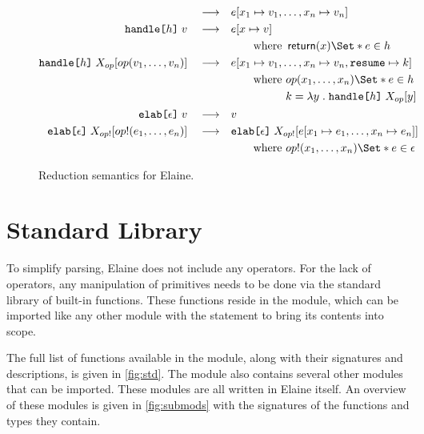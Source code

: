 \begin{figure}[p]
\begin{align*}
    \reduce& e[x_1 \mapsto v_1, \dots, x_n \mapsto v_n]
    \\
    \kw{handle}\tok{[}h\tok{]}\;v \reduce& e[x\mapsto v] \\
    &\qquad\text{where } \return(x) \S{ e } \in h\\
    \kw{handle}\tok{[}h\tok{]}\;X_{op}[op(v_1, \dots, v_n)] \reduce& e[x_1\mapsto v_1, \dots, x_n\mapsto v_n, \kw{resume} \mapsto k] \\
    &\qquad \text{where } \begin{aligned}[t]
        & op(x_1, \dots, x_n) \S{e} \in h\\
        & k = \lam{y}{\kw{handle}\tok{[}h\tok{]}\;
        X_{op}[y]}
    \end{aligned}\\
    \kw{elab}\tok{[}\epsilon\tok{]}\;v \reduce& v\\
    \kw{elab}\tok{[}\epsilon\tok{]}\;X_{op!}[op!(e_1, \dots, e_n)] \reduce& \kw{elab}\tok{[}\epsilon\tok{]}\;X_{op!}[e[x_1 \mapsto e_1, \dots, x_n \mapsto e_n]] \\
    &\qquad \text{where } op!(x_1, \dots, x_n) \S{e} \in \epsilon \\
\end{align*}
\label{fig:reductionsemantics}
\caption{Reduction semantics for Elaine.}
\end{figure}

\section{Standard Library}\label{sec:std}

To simplify parsing, Elaine does not include any operators. For the lack of operators, any manipulation of primitives needs to be done via the standard library of built-in functions. These functions reside in the  module, which can be imported like any other module with the  statement to bring its contents into scope.

The full list of functions available in the  module, along with their signatures and descriptions, is given in \cref{fig:std}. The  module also contains several other modules that can be imported. These modules are all written in Elaine itself. An overview of these modules is given in \cref{fig:submods} with the signatures of the functions and types they contain.

